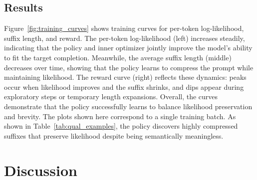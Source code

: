 \documentclass[11pt]{article}
\begin{document}



\subsection{Results}
\label{subsec:results}

Figure~\ref{fig:training_curves} shows training curves for per-token log-likelihood, suffix length, and reward. The per-token log-likelihood (left) increases steadily, indicating that the policy and inner optimizer jointly improve the model’s ability to fit the target completion. Meanwhile, the average suffix length (middle) decreases over time, showing that the policy learns to compress the prompt while maintaining likelihood. The reward curve (right) reflects these dynamics: peaks occur when likelihood improves and the suffix shrinks, and dips appear during exploratory steps or temporary length expansions. Overall, the curves demonstrate that the policy successfully learns to balance likelihood preservation and brevity. The plots shown here correspond to a single training batch. As shown in Table~\ref{tab:qual_examples}, the policy discovers highly compressed suffixes that preserve likelihood despite being semantically meaningless.







\section{Discussion}
\label{sec:discussion}
\end{document}
